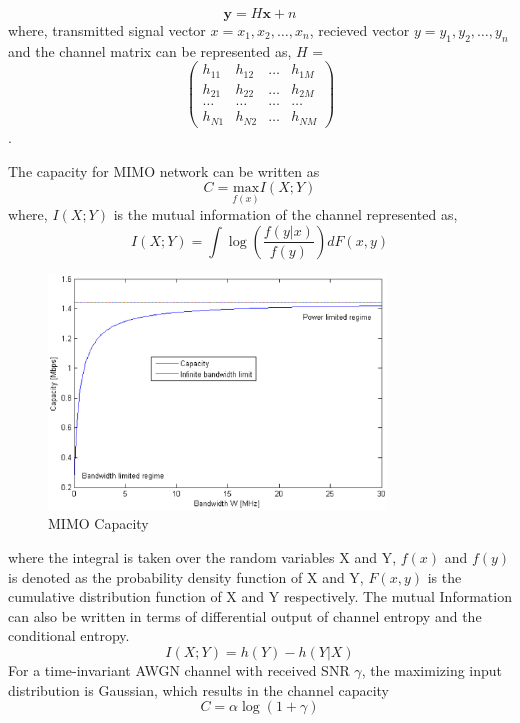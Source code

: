 \documentclass[a4paper, 12pt,titlepage]{dithesis} %
\newcommand{\me}[1]{\( #1 \)}
\begin{document}
\begin{equation}
\mathbf{y} = H \mathbf{x} + n
\label{bgmimo1_eqn}
\end{equation}
where, transmitted signal vector \me{x = x_1,x_2, \dotsc,x_n}, recieved vector \me{y = y_1, y_2, \dotsc, y_n} and the channel matrix can be represented as, \me{H} =  \[ \left( \begin{array}{cccc} 
	h_{11} & h_{12} & \dotsc & h_{1M} \\
	h_{21} & h_{22} & \dotsc & h_{2M} \\
	\dotsc & \dotsc & \dotsc & \dotsc \\
	h_{N1} & h_{N2} & \dotsc & h_{NM} \end{array} \right)\].

The capacity for \ac{MIMO} network can be written as
\begin{equation}
C = \underset{f(x)}{\text{max}} I(X;Y) 
\label{bgmimo2_eqn}
\end{equation} 
where, \me{I(X;Y)} is the mutual information of the channel represented as,
\begin{equation}
I(X;Y) = \int \log (\dfrac{f(y|x)}{f(y)}) dF(x,y)
\label{bgmimo3_eqn}
\end{equation}
\begin{figure}[h]
	\begin{center}
		\includegraphics[width= 0.8\textwidth]{mimocapacity.eps}
		\caption{MIMO Capacity}
	\end{center}
\end{figure}
where the integral is taken over the random variables X and Y, \me{f(x)} and \me{f(y)} is denoted as the probability density function of X and Y, \me{F(x,y)} is the cumulative distribution function of X and Y respectively. The mutual Information can also be written in terms of differential output of channel entropy and the conditional entropy. 
\begin{equation}
I(X;Y) = h(Y) - h(Y|X)
\label{bgmimo4_eqn}
\end{equation}
For a time-invariant \ac{AWGN} channel with received \ac{SNR} \me{\gamma}, the maximizing input distribution is Gaussian, which results in the channel capacity	
\begin{equation}
C = \alpha \log (1 + \gamma)
\label{bgmimo5_eqn}
\end{equation}
 
\end{document}

